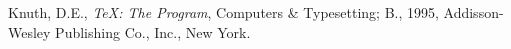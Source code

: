 \raggedright
\begin{enumerate}[{[1]}]
\item Knuth, D.E., \emph{TeX: The Program}, Computers \&
Typesetting; B., 1995, Addisson-Wesley Publishing Co., Inc., New
York.
\end{enumerate}
